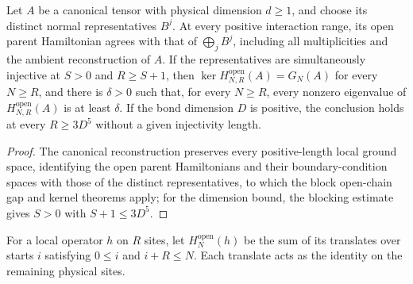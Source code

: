 \begin{lemma}
    \label{thm:canonical_open_gap_all_lengths}
    \leanok
    Let $A$ be a canonical tensor with physical dimension $d\geq1$, and
    choose its distinct normal representatives $B^j$. At every positive
    interaction range, its open parent Hamiltonian agrees with that of
    $\bigoplus_j B^j$, including all multiplicities and the ambient
    reconstruction of $A$. If the representatives are simultaneously
    injective at $S>0$ and $R\geq S+1$, then
    $\ker H^{\mathrm{open}}_{N,R}(A)=G_N(A)$ for every $N\geq R$,
    and there is $\delta>0$ such that, for every $N\geq R$, every nonzero
    eigenvalue of $H^{\mathrm{open}}_{N,R}(A)$ is at least $\delta$.
    If the bond dimension $D$ is positive, the conclusion holds at every
    $R\geq3D^5$ without a given injectivity length.
\end{lemma}
\begin{proof}\leanok
    The canonical reconstruction preserves every positive-length local
    ground space, identifying the open parent Hamiltonians and their
    boundary-condition spaces with those of the distinct representatives, to
    which the block open-chain gap and kernel theorems apply; for the dimension
    bound, the blocking estimate gives $S>0$ with $S+1\leq3D^5$.
\end{proof}

\begin{definition}
    \label{def:open_local_interaction_sum}
    \leanok
    For a local operator $h$ on $R$ sites, let
    $H^{\mathrm{open}}_N(h)$ be the sum of its translates over starts
    $i$ satisfying $0\leq i$ and $i+R\leq N$. Each translate acts as
    the identity on the remaining physical sites.
\end{definition}

